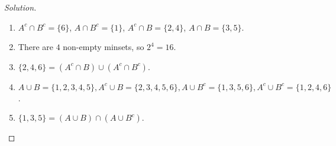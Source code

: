     \begin{proof}[Solution]
    \vspace{-\topsep}
    \
    \begin{enumerate}
        \item $A^c\cap B^c = \{6\}$, $A\cap B^c = \{1\}$, $A^c \cap B = \{2,4\}$, $A\cap B = \{3,5\}$.
        \item There are $4$ non-empty minsets, so $2^4 = 16$. 
        \item $\{2,4,6\} = (A^c \cap B)\cup (A^c \cap B^c)$.
        \item $A\cup B = \{1,2,3,4,5\}, A^c \cup B = \{2,3,4,5,6\}, A\cup B^c = \{1,3,5,6\}, A^c \cup B^c = \{1,2,4,6\}$.
        \item $\{1,3,5\} = (A\cup B) \cap (A\cup B^c)$.
    \end{enumerate}
    \end{proof}
